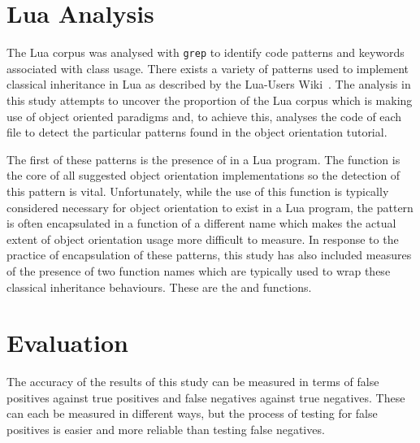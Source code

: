 \section{Lua Analysis}
The Lua corpus was analysed with \texttt{grep} to identify code patterns and keywords associated with class usage. There exists a variety of patterns used to implement classical inheritance in Lua as described by the Lua-Users Wiki~\cite{LuaObjectOrientation}. The analysis in this study attempts to uncover the proportion of the Lua corpus which is making use of object oriented paradigms and, to achieve this, analyses the code of each file to detect the particular patterns found in the object orientation tutorial.
\newline

The first of these patterns is the presence of  in a Lua program. The  function is the core of all suggested object orientation implementations so the detection of this pattern is vital. Unfortunately, while the use of this function is typically considered necessary for object orientation to exist in a Lua program, the pattern is often encapsulated in a function of a different name which makes the actual extent of object orientation usage more difficult to measure. In response to the practice of encapsulation of these patterns, this study has also included measures of the presence of two function names which are typically used to wrap these classical inheritance behaviours. These are the  and  functions.

\section{Evaluation}
The accuracy of the results of this study can be measured in terms of false positives against true positives and false negatives against true negatives. These can each be measured in different ways, but the process of testing for false positives is easier and more reliable than testing false negatives.
\newline

